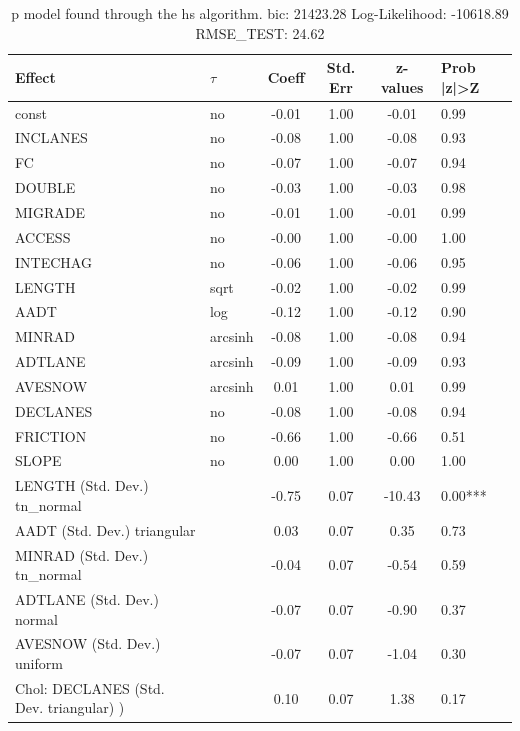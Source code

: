 \begin{table}
	\caption{p model found through the hs algorithm. bic: 21423.28 Log-Likelihood: -10618.89 RMSE_TEST: 24.62}
	\begin{center}
		\begin{tabular}{|l|l|c|c|c|l|}
			\hline
			Effect & $\tau$ & Coeff & Std. Err & z-values & Prob |z|>Z \\
			\hline
			const & no & -0.01 & 1.00 & -0.01 & 0.99 \\
			\hline
			INCLANES & no & -0.08 & 1.00 & -0.08 & 0.93 \\
			\hline
			FC & no & -0.07 & 1.00 & -0.07 & 0.94 \\
			\hline
			DOUBLE & no & -0.03 & 1.00 & -0.03 & 0.98 \\
			\hline
			MIGRADE & no & -0.01 & 1.00 & -0.01 & 0.99 \\
			\hline
			ACCESS & no & -0.00 & 1.00 & -0.00 & 1.00 \\
			\hline
			INTECHAG & no & -0.06 & 1.00 & -0.06 & 0.95 \\
			\hline
			LENGTH & sqrt & -0.02 & 1.00 & -0.02 & 0.99 \\
			\hline
			AADT & log & -0.12 & 1.00 & -0.12 & 0.90 \\
			\hline
			MINRAD & arcsinh & -0.08 & 1.00 & -0.08 & 0.94 \\
			\hline
			ADTLANE & arcsinh & -0.09 & 1.00 & -0.09 & 0.93 \\
			\hline
			AVESNOW & arcsinh & 0.01 & 1.00 & 0.01 & 0.99 \\
			\hline
			DECLANES & no & -0.08 & 1.00 & -0.08 & 0.94 \\
			\hline
			FRICTION & no & -0.66 & 1.00 & -0.66 & 0.51 \\
			\hline
			SLOPE & no & 0.00 & 1.00 & 0.00 & 1.00 \\
			\hline
			LENGTH (Std. Dev.) tn_normal &  & -0.75 & 0.07 & -10.43 & 0.00*** \\
			\hline
			AADT (Std. Dev.) triangular &  & 0.03 & 0.07 & 0.35 & 0.73 \\
			\hline
			MINRAD (Std. Dev.) tn_normal &  & -0.04 & 0.07 & -0.54 & 0.59 \\
			\hline
			ADTLANE (Std. Dev.) normal &  & -0.07 & 0.07 & -0.90 & 0.37 \\
			\hline
			AVESNOW (Std. Dev.) uniform &  & -0.07 & 0.07 & -1.04 & 0.30 \\
			\hline
			 Chol: DECLANES (Std. Dev. triangular) ) &  & 0.10 & 0.07 & 1.38 & 0.17 \\

\end{tabular}
\end{center}
\end{table}
